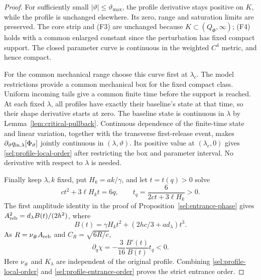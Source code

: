 \begin{proof}
For sufficiently small $|\vartheta|\le\vartheta_{\max}$, the
profile derivative stays positive on $K$, while the profile is
unchanged elsewhere. Its zero, range and saturation limits are
preserved. The core strip and (F3) are unchanged because
$K\subset(Q_\Phi,\infty)$; (F4) holds with a common enlarged
constant since the perturbation has fixed compact support. The
closed parameter curve is continuous in the weighted $C^4$ metric,
and hence compact.

For the common mechanical range choose this curve first at
$\lambda_c$. The model restrictions provide a common mechanical
box for the fixed compact class. Uniform incoming tails give a common
finite time before the support is reached. At each fixed $\lambda$,
all profiles have exactly their baseline's state at that time, so
their shape derivative starts at zero. The baseline state is
continuous in $\lambda$ by Lemma~\ref{lem:critical-pullback}.
Continuous dependence of the finite-time state and linear variation,
together with the transverse first-release event, makes
$\partial_\vartheta q_{\rm in,\lambda}[\Phi_\vartheta]$ jointly continuous
in $(\lambda,\vartheta)$. Its positive value at $(\lambda_c,0)$
gives \eqref{sel:profile-local-order} after restricting the box and
parameter interval. No derivative with respect to $\lambda$ is needed.

Finally keep $\lambda,k$ fixed, put $H_k=ak/\gamma$, and let
$t=t(q)>0$ solve
\[
 ct^2+3\ell H_kt=6q,\qquad t_q=\frac6{2ct+3\ell H_k}>0.
\]
The first amplitude identity in the proof of
Proposition~\ref{sel:entrance-phase} gives
$A_{\rm reb}^2=d_\lambda B(t)/(2h^2)$, where
\[
 B(t)=\gamma H_kt^2+(2hc/3+ad_\lambda)t^3.
\]
As $R=\nu_\#A_{\rm reb}$ and $C_R=\sqrt{6R/c}$,
\begin{equation}
 \partial_q\chi=-\frac3{16}\frac{B'(t)}{B(t)}t_q<0.
 \label{sel:profile-entrance-order}
\end{equation}
Here $\nu_\#$ and $K_\lambda$ are independent of the original
profile. Combining \eqref{sel:profile-local-order} and
\eqref{sel:profile-entrance-order} proves the strict entrance order.
\end{proof}
